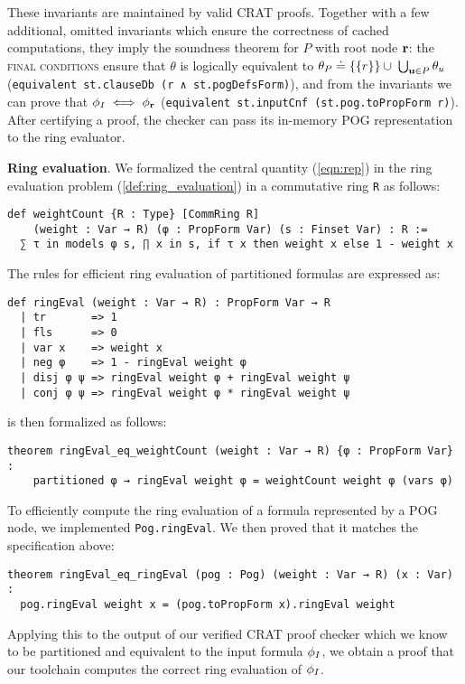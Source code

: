 These invariants are maintained by valid CRAT proofs. Together with a few additional, omitted invariants
which ensure the correctness of cached computations, they imply the soundness theorem for $P$ with root
node $\mathbf{r}$: the \textsc{final conditions} ensure that $\theta$ is logically equivalent to
$\theta_P \doteq \{\{r\}\} \cup \; \bigcup_{\mathbf{u} \in P} \theta_{u}$
(\lstinline{equivalent st.clauseDb (r ∧ st.pogDefsForm)}), and from the invariants we can prove that
$\phi_I \iff \phi_{\mathbf{r}}$ (\lstinline{equivalent st.inputCnf (st.pog.toPropForm r)}). 
After certifying a proof, the checker can pass its in-memory POG representation to the ring evaluator.

\vspace{1em}\noindent
\textbf{Ring evaluation}. We formalized the central quantity (\ref{eqn:rep}) in the ring evaluation problem
(\cref{def:ring_evaluation}) in a commutative ring \lstinline{R} as follows:
\begin{lstlisting}
def weightCount {R : Type} [CommRing R]
    (weight : Var → R) (φ : PropForm Var) (s : Finset Var) : R :=
  ∑ τ in models φ s, ∏ x in s, if τ x then weight x else 1 - weight x
\end{lstlisting}
The rules for efficient ring evaluation of partitioned formulas are expressed as:
\begin{lstlisting}
def ringEval (weight : Var → R) : PropForm Var → R
  | tr       => 1
  | fls      => 0
  | var x    => weight x
  | neg φ    => 1 - ringEval weight φ
  | disj φ ψ => ringEval weight φ + ringEval weight ψ
  | conj φ ψ => ringEval weight φ * ringEval weight ψ
\end{lstlisting}
 is then formalized as follows:
\begin{lstlisting}
theorem ringEval_eq_weightCount (weight : Var → R) {φ : PropForm Var} :
    partitioned φ → ringEval weight φ = weightCount weight φ (vars φ)
\end{lstlisting}

To efficiently compute the ring evaluation of a formula represented by a POG node, we implemented
\lstinline{Pog.ringEval}. We then proved that it matches the specification above:
\begin{lstlisting}
theorem ringEval_eq_ringEval (pog : Pog) (weight : Var → R) (x : Var) :
  pog.ringEval weight x = (pog.toPropForm x).ringEval weight
\end{lstlisting}

Applying this to the output of our verified CRAT proof checker which we know to be partitioned
and equivalent to the input formula $\phi_I$, we obtain a proof that our toolchain computes
the correct ring evaluation of $\phi_I$.

